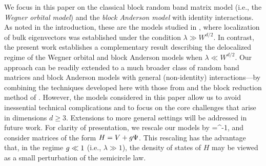 We focus in this paper on the classical block random band matrix model (i.e., the \emph{Wegner orbital model}) and the \emph{block Anderson model} with identity interactions. As noted in the introduction, these are the models studied in \cite{PelSchShaSod}, where localization of bulk eigenvectors was established under the condition $\lambda \gg W^{d/2}$. In contrast, the present work establishes a complementary result describing the delocalized regime of the Wegner orbital and block Anderson models when $\lambda \ll W^{d/2}$. 
Our approach can be readily extended to a much broader class of random band matrices and block Anderson models with general (non-identity) interactions---by combining the techniques developed here with those from \cite{RBSO1D} and the block reduction method of \cite{Block_reduction}. However, the models considered in this paper allow us to avoid inessential technical complications and to focus on the core challenges that arise in dimensions $d \ge 3$. Extensions to more general settings will be addressed in future work.
For clarity of presentation, we rescale our models by 
\be\label{def:ilambda}\ilambda=\lambda^{-1},\ee
and consider matrices of the form $H=V+g\Psi$. 
This rescaling has the advantage that, in the regime $g\ll 1$ (i.e., $\lambda\gg 1$), the density of states of $H$ may be viewed as a small perturbation of the semicircle law. 


